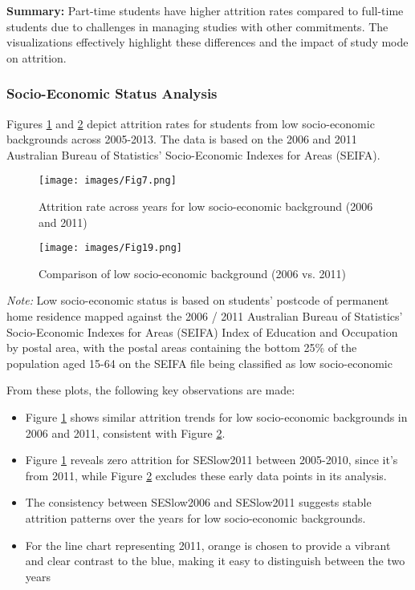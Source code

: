 \documentclass[conference]{IEEEtran}
\begin{document}
\textbf{Summary:} Part-time students have higher attrition rates compared to full-time students due to challenges in managing studies with other commitments. The visualizations effectively highlight these differences and the impact of study mode on attrition.

\subsubsection{Socio-Economic Status Analysis}

Figures \ref{fig:barline2} and \ref{fig:squar1} depict attrition rates for students from low socio-economic backgrounds across 2005-2013. The data is based on the 2006 and 2011 Australian Bureau of Statistics' Socio-Economic Indexes for Areas (SEIFA).

\begin{figure}[H]
    \centering
    \texttt{[image: images/Fig7.png]}
    \caption{Attrition rate across years for low socio-economic background (2006 and 2011)}
    \label{fig:barline2}    
\end{figure}

\begin{figure}[H]
    \centering
    \texttt{[image: images/Fig19.png]}
    \caption{Comparison of low socio-economic background (2006 vs. 2011)}
    \label{fig:squar1}    
\end{figure}

\par \textit{Note:} Low socio-economic status is based on students’ postcode of permanent home residence mapped against the 2006 / 2011 Australian Bureau of Statistics' Socio-Economic Indexes for Areas (SEIFA) Index of Education and Occupation by postal area, with the postal areas containing the bottom 25\% of the population aged 15-64 on the SEIFA file being classified as low socio-economic

\par From these plots, the following key observations are made:
\begin{itemize} 
    \item Figure \ref{fig:barline2} shows similar attrition trends for low socio-economic backgrounds in 2006 and 2011, consistent with Figure \ref{fig:squar1}.
    \item Figure \ref{fig:barline2} reveals zero attrition for SESlow2011 between 2005-2010, since it's from 2011, while Figure \ref{fig:squar1} excludes these early data points in its analysis.
    \item The consistency between SESlow2006 and SESlow2011 suggests stable attrition patterns over the years for low socio-economic backgrounds.
    \item For the line chart representing 2011, orange is chosen to provide a vibrant and clear contrast to the blue, making it easy to distinguish between the two years
\end{itemize}
\end{document}
